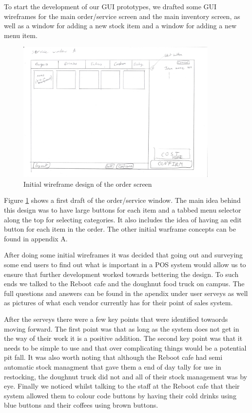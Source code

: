 To start the development of our GUI prototypes, we drafted some GUI wireframes for the main order/service screen and the main inventory screen, as well as a window for adding a new stock item and a window for adding a new menu item.

\begin{figure}[ht]
	\centering
	\includegraphics[width=100mm,angle=-90]{images/Wireframe_drafts/Service_window_A.JPG}
	\caption{Initial wireframe design of the order screen}
	\label{fig:Service_window_A}
\end{figure}

Figure \ref{fig:Service_window_A} shows a first draft of the order/service window. The main idea behind this design was to have large buttons for each item and a tabbed menu selector along the top for selecting categories. It also includes the idea of having an edit button for each item in the order. The other initial warframe concepts can be found in appendix A.

After doing some initial wireframes it was decided that going out and surveying some end users to find out what is important in a POS system would allow us to ensure that further development worked towards bettering the design. To such ends we talked to the Reboot cafe and the doughnut food truck on campus. The full questions and answers can be found in the apendix under user serveys as well as pictures of what each vendor currently has for their point of sales system.

After the serveys there were a few key points that were identified towaords moving forward. The first point was that as long as the system does not get in the way of their work it is a positive addition. The second key point was that it needs to be simple to use and that over complicating things would be a potential pit fall. It was also worth noting that although the Reboot cafe had semi automatic stock managment that gave them a end of day tally for use in restocking, the doughnut truck did not and all of their stock management was by eye. Finally we noticed whilst talking to the staff at the Reboot cafe that their system allowed them to colour code buttons by having their cold drinks using blue buttons and their coffees using brown buttons.

